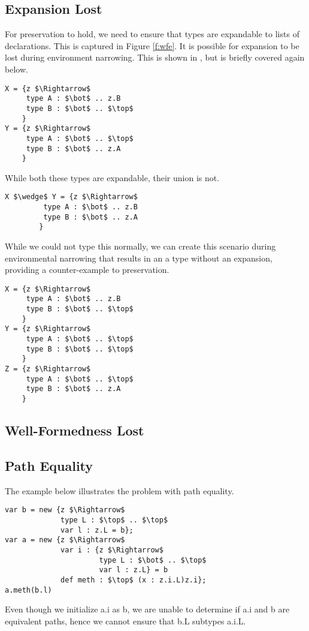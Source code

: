 \documentclass{llncs}
\begin{document}
\subsection{Expansion Lost}
For preservation to hold, we need to ensure that types are expandable 
to lists of declarations. This is captured in Figure \ref{f:wfe}. It is 
possible for expansion to be lost during environment narrowing. This is 
shown in \cite{Amin:2012}, but is briefly covered again below.
\begin{lstlisting}[mathescape, style=custom_lang]
X = {z $\Rightarrow$
     type A : $\bot$ .. z.B
     type B : $\bot$ .. $\top$
    }
Y = {z $\Rightarrow$
     type A : $\bot$ .. $\top$
     type B : $\bot$ .. z.A
    }
\end{lstlisting}
While both these types are expandable, their union is not.
\begin{lstlisting}[mathescape, style=custom_lang]
X $\wedge$ Y = {z $\Rightarrow$
         type A : $\bot$ .. z.B
         type B : $\bot$ .. z.A
        }
\end{lstlisting}
While we could not type this normally, we can create this 
scenario during environmental narrowing that results in 
an a type without an expansion, providing a counter-example 
to preservation.
\begin{lstlisting}[mathescape, style=custom_lang]
X = {z $\Rightarrow$
     type A : $\bot$ .. z.B
     type B : $\bot$ .. $\top$
    }
Y = {z $\Rightarrow$
     type A : $\bot$ .. $\top$
     type B : $\bot$ .. $\top$
    }
Z = {z $\Rightarrow$
     type A : $\bot$ .. $\top$
     type B : $\bot$ .. z.A
    }
\end{lstlisting}



\subsection{Well-Formedness Lost}

\subsection{Path Equality}
\label{s:patheq}
The example below illustrates the problem with path equality.
\begin{lstlisting}[mathescape, style=custom_lang]
var b = new {z $\Rightarrow$
             type L : $\top$ .. $\top$
             var l : z.L = b};
var a = new {z $\Rightarrow$
             var i : {z $\Rightarrow$
                      type L : $\bot$ .. $\top$
                      var l : z.L} = b
             def meth : $\top$ (x : z.i.L)z.i};
a.meth(b.l)
\end{lstlisting}
Even though we initialize a.i as b, we are unable to determine if
a.i and b are equivalent paths, hence we cannot ensure that b.L subtypes 
a.i.L.
\end{document}
